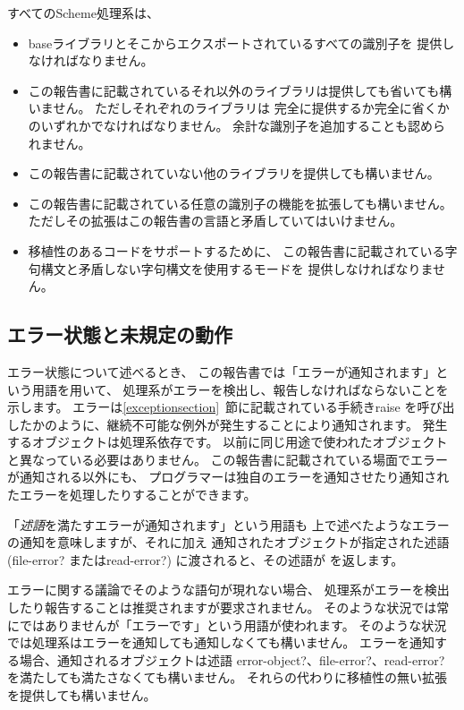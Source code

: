 すべてのScheme処理系は、
\begin{itemize}

\item baseライブラリとそこからエクスポートされているすべての識別子を
提供しなければなりません。

\item この報告書に記載されているそれ以外のライブラリは提供しても省いても構いません。
ただしそれぞれのライブラリは
完全に提供するか完全に省くかのいずれかでなければなりません。
余計な識別子を追加することも認められません。

\item この報告書に記載されていない他のライブラリを提供しても構いません。

\item この報告書に記載されている任意の識別子の機能を拡張しても構いません。
ただしその拡張はこの報告書の言語と矛盾していてはいけません。

\item 移植性のあるコードをサポートするために、
この報告書に記載されている字句構文と矛盾しない字句構文を使用するモードを
提供しなければなりません。
\end{itemize}

\subsection{エラー状態と未規定の動作}
\label{errorsituations}

エラー状態について述べるとき、
この報告書では「エラーが通知されます」という用語を用いて、
処理系がエラーを検出し、報告しなければならないことを示します。
エラーは\ref{exceptionsection}~節に記載されている手続き{\cf raise}
を呼び出したかのように、継続不可能な例外が発生することにより通知されます。
発生するオブジェクトは処理系依存です。
以前に同じ用途で使われたオブジェクトと異なっている必要はありません。
この報告書に記載されている場面でエラーが通知される以外にも、
プログラマーは独自のエラーを通知させたり通知されたエラーを処理したりすることができます。

「{\em 述語}を満たすエラーが通知されます」という用語も
上で述べたようなエラーの通知を意味しますが、それに加え
通知されたオブジェクトが指定された述語({\cf file-error?} または{\cf read-error?})
に渡されると、その述語が \schtrue{} を返します。

\vest エラーに関する議論でそのような語句が現れない場合、
処理系がエラーを検出したり報告することは推奨されますが要求されません。
そのような状況では常にではありませんが「エラーです」という用語が使われます。
そのような状況では処理系はエラーを通知しても通知しなくても構いません。
エラーを通知する場合、通知されるオブジェクトは述語
{\cf error-object?}、{\cf file-error?}、{\cf read-error?} 
を満たしても満たさなくても構いません。
それらの代わりに移植性の無い拡張を提供しても構いません。

